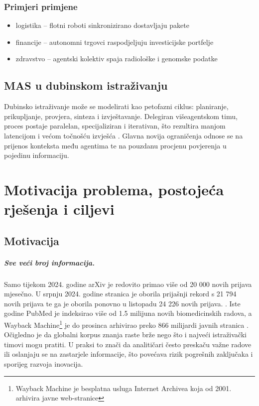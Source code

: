 \documentclass[zavrsnirad]{fer}
\begin{document}
\subsection{Primjeri primjene}
\begin{itemize}
  \item logistika – flotni roboti sinkronizirano dostavljaju pakete
  \item financije – autonomni trgovci raspodjeljuju investicijske portfelje
  \item zdravstvo – agentski kolektiv spaja radiološke i genomske podatke
\end{itemize}

\section{MAS u dubinskom istraživanju}
\label{subsec:DeepResearch}

Dubinsko istraživanje može se modelirati kao petofazni ciklus:
planiranje, prikupljanje,
provjera, sinteza i izvještavanje.
Delegiran višea\-gent\-skom timu,
proces postaje paralelan,
specijaliziran i iterativan,
što rezultira manjom latencijom i većom točnošću izvješća
\cite{magentic2024,captainagent2025}.
Glavna novija ograničenja odnose se na
prijenos konteksta među agentima
te na pouzdanu procjenu povjerenja u pojedinu
informaciju.


\chapter{Motivacija problema, postojeća rješenja i ciljevi}

\section{Motivacija}
\label{sec:motivation}

\paragraph{Sve veći broj informacija.}
Samo tijekom 2024. godine arXiv je redovito primao više od 20 000 novih prijava mjesečno. 
U srpnju 2024. godine stranica je oborila prijašnji rekord s 21 794 novih prijava te ga je oborila ponovno u listopadu 24 226 novih prijava. \cite{Boboris2024}.
Iste godine PubMed je indeksirao više od 1.5 milijuna novih biomedicinskih radova\cite{PubMedLandscape2024}, a Wayback Machine\footnote{Wayback Machine je besplatna usluga Internet Archivea koja od 2001. arhivira javne web-stranice} je do prosinca arhivirao preko 866 milijardi javnih stranica \cite{Wayback2024}. Očigledno je da globalni korpus znanja raste brže nego što i najveći istraživački timovi mogu pratiti. U praksi to znači da analitičari često preskaču važne radove ili oslanjaju se na zastarjele informacije, što povećava rizik pogrešnih zaključaka i sporijeg razvoja inovacija.
\end{document}
